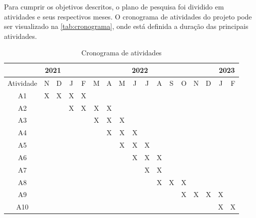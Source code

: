 \documentclass[12pt, a4paper, english, brazil]{article}
\begin{document}
Para cumprir os objetivos descritos, o plano de pesquisa foi dividido em atividades e seus respectivos meses. O cronograma de atividades do projeto pode ser visualizado na \autoref{tab:cronograma}, onde está definida a
duração das principais atividades.

\begin{table}[htb]
\centering
\caption{Cronograma de atividades}
\label{tab:cronograma}
\begin{tabular}{|c|c|c|c|c|c|c|c|c|c|c|c|c|c|c|c|c|}
\hline
          & \multicolumn{2}{c|}{2021} & \multicolumn{12}{c|}{2022}                    & \multicolumn{2}{c|}{2023} \\ \hline
Atividade & N           & D           & J & F & M & A & M & J & J & A & S & O & N & D & J           & F           \\ \hline
A1        & X           & X           & X & X &   &   &   &   &   &   &   &   &   &   &             &             \\ \hline
A2        &             &             & X & X & X & X &   &   &   &   &   &   &   &   &             &             \\ \hline
A3        &             &             &   &   & X & X & X &   &   &   &   &   &   &   &             &             \\ \hline
A4        &             &             &   &   &   & X & X & X &   &   &   &   &   &   &             &             \\ \hline
A5        &             &             &   &   &   &   & X & X & X &   &   &   &   &   &             &             \\ \hline
A6        &             &             &   &   &   &   &   & X & X & X &   &   &   &   &             &             \\ \hline
A7        &             &             &   &   &   &   &   &   & X & X &   &   &   &   &             &             \\ \hline
A8        &             &             &   &   &   &   &   &   &   & X & X & X &   &   &             &             \\ \hline
A9        &             &             &   &   &   &   &   &   &   &   &   & X & X & X & X           &             \\ \hline
A10       &             &             &   &   &   &   &   &   &   &   &   &   &   &   & X           & X           \\ \hline
\end{tabular}
\end{table}
\end{document}
